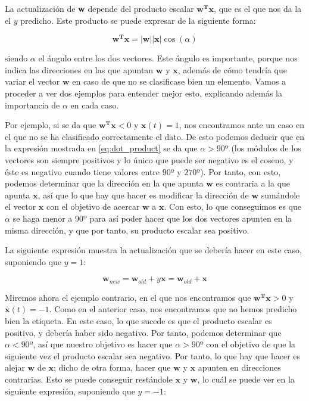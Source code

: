 \documentclass[11pt,a4paper]{article}
\begin{document}
La actualización de \textbf{w} depende del producto escalar $\mathbf{w^\textbf{T}\mathbf{x}}$, que es el que nos da la
el $y$ predicho. Este producto se puede expresar de la siguiente forma:

\begin{equation}
\label{eq:dot_product}
	\mathbf{w^\textbf{T}\mathbf{x}} = |\mathbf{w}| |\mathbf{x}| \cos(\alpha)
\end{equation}

\noindent siendo $\alpha$ el ángulo entre los dos vectores. Este ángulo es importante, porque nos indica las direcciones en las que apuntan $\mathbf{w}$ y $\mathbf{x}$, además de cómo tendría que variar el vector $\mathbf{w}$ en caso de que no se
clasificase bien un elemento. Vamos a proceder a ver dos ejemplos para entender mejor esto, explicando además la importancia
de $\alpha$ en cada caso.

Por ejemplo, si se da que $\mathbf{w^\textbf{T}\mathbf{x}} < 0$ y $\mathbf{x}(t) = 1$, nos encontramos ante un caso en el que
no se ha clasificado correctamente el dato. De esto podemos deducir que en la expresión mostrada en \eqref{eq:dot_product} se
da que $\alpha > 90º$ (los módulos de los vectores son siempre positivos y lo único que puede ser
negativo es el coseno, y éste es negativo cuando tiene valores entre $90º$ y  $270º$). Por tanto, con esto, podemos determinar
que la dirección en la que apunta $\mathbf{w}$ es contraria a la que apunta $\mathbf{x}$, así que lo que hay que hacer
es modificar la dirección de $\mathbf{w}$ sumándole el vector $\mathbf{x}$ con el objetivo de acercar $\mathbf{w}$ a
$\mathbf{x}$. Con esto, lo que conseguimos es que $\alpha$ se haga menor a $90º$ para así poder hacer que los dos vectores
apunten en la misma dirección, y que por tanto, su producto escalar sea positivo. 

La siguiente expresión muestra la actualización que se debería hacer en este caso, suponiendo que $y = 1$:

\begin{equation}
	\mathbf{w}_{new} = \mathbf{w}_{old} + y\mathbf{x} = \mathbf{w}_{old} + \mathbf{x}
\end{equation}

Miremos ahora el ejemplo contrario, en el que nos encontramos que $\mathbf{w^\textbf{T}\mathbf{x}} > 0$ y
$\mathbf{x}(t) = -1$. Como en el anterior caso, nos encontramos que no hemos predicho bien la etiqueta. En este caso, lo que
sucede es que el producto escalar es positivo, y debería haber sido negativo. Por tanto, podemos determinar que
$\alpha < 90º$, así que nuestro objetivo es hacer que $\alpha > 90º$ con el objetivo de que la siguiente vez el producto
escalar sea negativo. Por tanto, lo que hay que hacer es alejar $\mathbf{w}$ de $\mathbf{x}$; dicho de otra forma, hacer que 
$\mathbf{w}$ y $\mathbf{x}$ apunten en direcciones contrarias. Esto se puede conseguir restándole $\mathbf{x}$ y $\mathbf{w}$,
lo cuál se puede ver en la siguiente expresión, suponiendo que $y = -1$:
\end{document}
